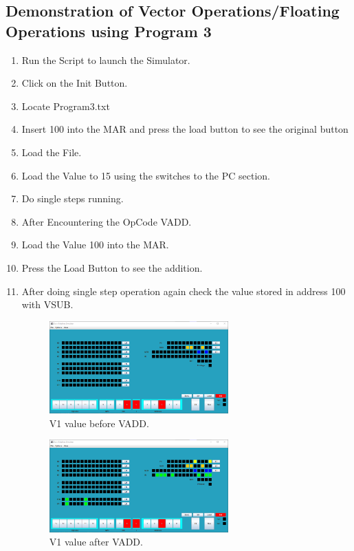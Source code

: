 \documentclass[10pt]{article}
\begin{document}
\subsection{Demonstration of Vector Operations/Floating Operations using Program 3}
\begin{enumerate}
  \item Run the Script to launch the Simulator.
  \item Click on the Init Button.
  \item Locate Program3.txt
  \item Insert 100 into the MAR and press the load button to see the original button
  \item Load the File.
  \item Load the Value to 15 using the switches to the PC section.
  \item Do single steps running. 
  \item After Encountering the OpCode VADD.
  \item Load the Value 100 into the MAR.
  \item Press the Load Button to see the addition.
  \item After doing single step operation again check the value stored in address 100 with VSUB.
  \begin{figure}[H]
    \centering
    \includegraphics[width=0.65\textwidth]{Pics/V1.png}
    \caption{V1 value before VADD.}
    \label{fig:V1BVADD}
  \end{figure}
  \begin{figure}[H]
    \centering
    \includegraphics[width=0.65\textwidth]{Pics/V1_after.png}
    \caption{V1 value after VADD.}
    \label{fig:V1BVADD2}
  \end{figure}
\end{enumerate}
\end{document}
